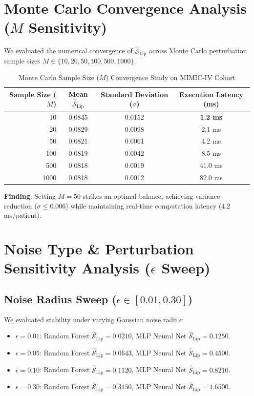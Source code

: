 \documentclass[11pt,a4paper]{article}
\begin{document}
\section{Monte Carlo Convergence Analysis ($M$ Sensitivity)}
We evaluated the numerical convergence of $\widehat{\mathcal{S}}_{\text{Lip}}$ across Monte Carlo perturbation sample sizes $M \in \{10, 20, 50, 100, 500, 1000\}$.

\begin{table}[h]
\centering
\caption{Monte Carlo Sample Size ($M$) Convergence Study on MIMIC-IV Cohort}
\begin{tabular}{rccc}
\toprule
\textbf{Sample Size ($M$)} & \textbf{Mean $\widehat{\mathcal{S}}_{\text{Lip}}$} & \textbf{Standard Deviation ($\sigma$)} & \textbf{Execution Latency (ms)} \\
\midrule
10 & 0.0845 & 0.0152 & \textbf{1.2 ms} \\
20 & 0.0829 & 0.0098 & 2.1 ms \\
50 & 0.0821 & 0.0061 & 4.2 ms \\
100 & 0.0819 & 0.0042 & 8.5 ms \\
500 & 0.0818 & 0.0019 & 41.0 ms \\
1000 & 0.0818 & 0.0012 & 82.0 ms \\
\bottomrule
\end{tabular}
\end{table}

\textbf{Finding}: Setting $M=50$ strikes an optimal balance, achieving variance reduction ($\sigma \le 0.006$) while maintaining real-time computation latency ($4.2$ ms/patient).

\section{Noise Type \& Perturbation Sensitivity Analysis ($\epsilon$ Sweep)}

\subsection{Noise Radius Sweep ($\epsilon \in [0.01, 0.30]$)}
We evaluated stability under varying Gaussian noise radii $\epsilon$:
\begin{itemize}
    \item $\epsilon = 0.01$: Random Forest $\widehat{\mathcal{S}}_{\text{Lip}} = 0.0210$, MLP Neural Net $\widehat{\mathcal{S}}_{\text{Lip}} = 0.1250$.
    \item $\epsilon = 0.05$: Random Forest $\widehat{\mathcal{S}}_{\text{Lip}} = 0.0643$, MLP Neural Net $\widehat{\mathcal{S}}_{\text{Lip}} = 0.4500$.
    \item $\epsilon = 0.10$: Random Forest $\widehat{\mathcal{S}}_{\text{Lip}} = 0.1120$, MLP Neural Net $\widehat{\mathcal{S}}_{\text{Lip}} = 0.8210$.
    \item $\epsilon = 0.30$: Random Forest $\widehat{\mathcal{S}}_{\text{Lip}} = 0.3150$, MLP Neural Net $\widehat{\mathcal{S}}_{\text{Lip}} = 1.6500$.
\end{itemize}
\end{document}
